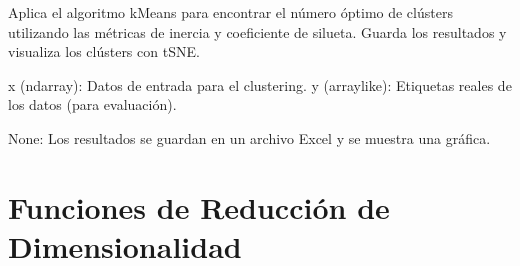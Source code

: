 \documentclass[letterpaper,10pt,spanish]{sphinxmanual}
\begin{document}

\begin{fulllineitems}
\label{\detokenize{Clustering:clustering.kmeans}}
\pysigstartsignatures
\pysiglinewithargsret
{}
{\sphinxparamcomma {}}
{}
\pysigstopsignatures
\sphinxAtStartPar
Aplica el algoritmo k\sphinxhyphen{}Means para encontrar el número óptimo de clústers 
utilizando las métricas de inercia y coeficiente de silueta. Guarda los resultados 
y visualiza los clústers con t\sphinxhyphen{}SNE.
\begin{description}
\sphinxAtStartPar
x (ndarray): Datos de entrada para el clustering.
y (array\sphinxhyphen{}like): Etiquetas reales de los datos (para evaluación).

\sphinxAtStartPar
None: Los resultados se guardan en un archivo Excel y se muestra una gráfica.

\end{description}

\end{fulllineitems}


\sphinxstepscope


\chapter{Funciones de Reducción de Dimensionalidad}
\label{\detokenize{Reduccion_Dimension:module-Modelos}}\label{\detokenize{Reduccion_Dimension:funciones-de-reduccion-de-dimensionalidad}}\label{\detokenize{Reduccion_Dimension::doc}}
\end{document}
